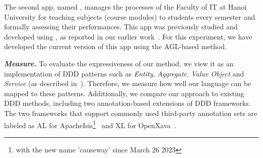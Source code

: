 The second app, named \processman, manages the processes of the Faculty of IT at Hanoi University for teaching subjects (\aka course modules) to students every semester and formally assessing their performances. This app was previously studied and developed using \dcsl, as reported in our earlier work~\cite{le_generative_2018}. For this experiment, we have developed the current version of this app using the AGL-based method.

\vspace{0.1cm}
\noindent\textit{\textbf{Measure.}} 
To evaluate the expressiveness of our method, we view it as an implementation of DDD patterns such as \textit{Entity}, \textit{Aggregate}, \textit{Value Object} and \textit{Service} (as described in~\cite{evans_domain-driven_2004}). Therefore, we measure how well our language can be mapped to these patterns. Additionally, we compare our approach to existing DDD methods, including two annotation-based extensions of DDD frameworks. The two frameworks that support commonly used third-party annotation sets are labeled as AL for ApacheIsis\footnote{with the new name 'causeway' since March 26 2023}~\cite{apache_causeway_2023} and XL for OpenXava~\cite{noauthor_openxava_2016}.

%


